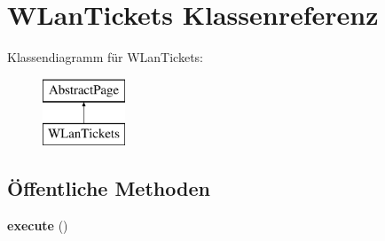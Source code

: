 \hypertarget{class_w_lan_tickets}{}\section{W\+Lan\+Tickets Klassenreferenz}
\label{class_w_lan_tickets}
Klassendiagramm für W\+Lan\+Tickets\+:\begin{figure}[H]
\begin{center}
\leavevmode
\includegraphics[height=2.000000cm]{class_w_lan_tickets}
\end{center}
\end{figure}
\subsection*{Öffentliche Methoden}
\begin{DoxyCompactItemize}
\item 
\mbox{\label{class_w_lan_tickets_a72bed8ad34c5a3abee08904c9c9f6c22}} 
{\bfseries execute} ()
\end{DoxyCompactItemize}
